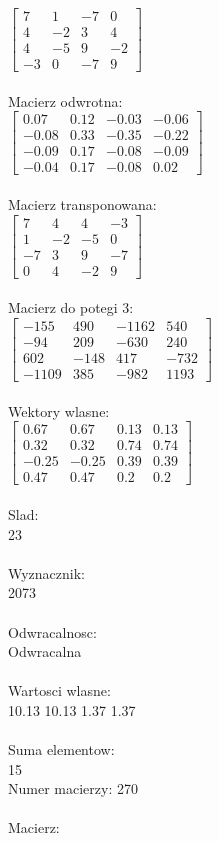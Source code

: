\documentclass[a4paper,12pt]{article}
\begin{document}
$\begin{bmatrix} 7&1&-7&0\\4&-2&3&4\\4&-5&9&-2\\-3&0&-7&9 \end{bmatrix}$
\\
\\
Macierz odwrotna:\\

$\begin{bmatrix} 0.07&0.12&-0.03&-0.06\\-0.08&0.33&-0.35&-0.22\\-0.09&0.17&-0.08&-0.09\\-0.04&0.17&-0.08&0.02 \end{bmatrix}$
\\
\\
Macierz transponowana:\\

$\begin{bmatrix} 7&4&4&-3\\1&-2&-5&0\\-7&3&9&-7\\0&4&-2&9 \end{bmatrix}$
\\
\\
Macierz do potegi 3:\\

$\begin{bmatrix} -155&490&-1162&540\\-94&209&-630&240\\602&-148&417&-732\\-1109&385&-982&1193 \end{bmatrix}$
\\
\\
Wektory wlasne:\\

$\begin{bmatrix} 0.67&0.67&0.13&0.13\\0.32&0.32&0.74&0.74\\-0.25&-0.25&0.39&0.39\\0.47&0.47&0.2&0.2 \end{bmatrix}$
\\
\\
Slad:\\
23
\\
\\
Wyznacznik:\\
2073
\\
\\
Odwracalnosc:\\
Odwracalna
\\
\\
Wartosci wlasne:\\
10.13 10.13 1.37 1.37
\\
\\
Suma elementow:\\
15
\\
\newpage
Numer macierzy:
270
\\
\\
Macierz:\\
\end{document}
